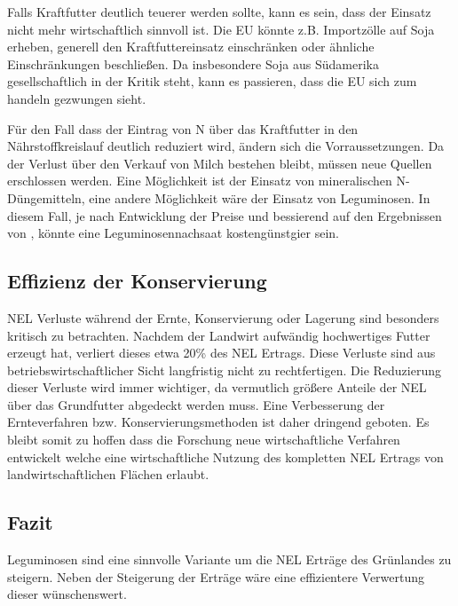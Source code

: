 Falls Kraftfutter deutlich teuerer werden sollte, kann es sein, dass der Einsatz nicht mehr wirtschaftlich sinnvoll ist.
Die \ac{EU} könnte z.B. Importzölle auf Soja erheben, generell den Kraftfuttereinsatz einschränken oder ähnliche Einschränkungen beschließen.
Da insbesondere Soja aus Südamerika gesellschaftlich in der Kritik steht, kann es passieren, dass die \ac{EU} sich zum handeln gezwungen sieht.

Für den Fall dass der Eintrag von N über das Kraftfutter in den Nährstoffkreislauf deutlich reduziert wird, ändern sich die Vorraussetzungen.
Da der Verlust über den Verkauf von Milch bestehen bleibt, müssen neue Quellen erschlossen werden.
Eine Möglichkeit ist der Einsatz von mineralischen N-Düngemitteln, eine andere Möglichkeit wäre der Einsatz von Leguminosen.
In diesem Fall, je nach Entwicklung der Preise und bessierend auf den Ergebnissen von \textcite[33-36]{weggler2050leguminosen}, könnte eine Leguminosennachsaat kostengünstgier sein.


\subsection{Effizienz der Konservierung}
\label{sub:konservierung}
\ac{NEL} Verluste während der Ernte, Konservierung oder Lagerung sind besonders kritisch zu betrachten.
Nachdem der Landwirt aufwändig hochwertiges Futter erzeugt hat, verliert dieses etwa 20\% des \ac{NEL} Ertrags.
Diese Verluste sind aus betriebswirtschaftlicher Sicht langfristig nicht zu rechtfertigen.
Die Reduzierung dieser Verluste wird immer wichtiger, da vermutlich größere Anteile der \ac{NEL} über das Grundfutter abgedeckt werden muss.
Eine Verbesserung der Ernteverfahren bzw. Konservierungsmethoden ist daher dringend geboten.
Es bleibt somit zu hoffen dass die Forschung neue wirtschaftliche Verfahren entwickelt welche eine wirtschaftliche Nutzung des kompletten \ac{NEL} Ertrags von landwirtschaftlichen Flächen erlaubt.

\subsection{Fazit}
\label{subsec:fazit}
Leguminosen sind eine sinnvolle Variante um die \ac{NEL} Erträge des Grünlandes zu steigern.
Neben der Steigerung der Erträge wäre eine effizientere Verwertung dieser wünschenswert.
